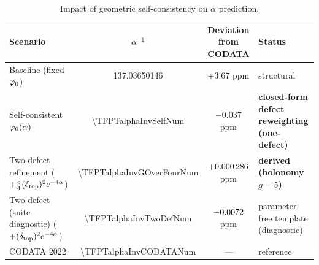 \begin{table}[H]
\centering
\small
\setlength{\tabcolsep}{4pt}
\begin{tabularx}{\linewidth}{@{}lccX@{}}
\toprule
\textbf{Scenario} & $\alpha^{-1}$ & \textbf{Deviation from CODATA} & \textbf{Status}\\
\midrule
Baseline (fixed $\varphi_0$) & 137.03650146 & $+3.67$ ppm & structural\\
Self-consistent $\varphi_0(\alpha)$ & \num[round-mode=places,round-precision=10]{\TFPTalphaInvSelfNum} & $-0.037$ ppm & \textbf{closed-form defect reweighting (one-defect)}\\
Two-defect refinement ($+\tfrac54(\delta_{\mathrm{top}})^2 e^{-4\alpha}$) & \num[round-mode=places,round-precision=12]{\TFPTalphaInvGOverFourNum} & $+\num[round-mode=places,round-precision=6]{\TFPTalphaPpmGOverFourNum}$ ppm & \textbf{derived (holonomy $g=5$)}\\
Two-defect (suite diagnostic) ($+(\delta_{\mathrm{top}})^2 e^{-4\alpha}$) & \num[round-mode=places,round-precision=10]{\TFPTalphaInvTwoDefNum} & $\num[round-mode=places,round-precision=4]{\TFPTalphaPpmTwoDefNum}$ ppm & parameter-free template (diagnostic)\\
CODATA 2022 & \num[round-mode=places,round-precision=9]{\TFPTalphaInvCODATANum} & --- & reference\\
\bottomrule
\end{tabularx}
\caption{Impact of geometric self-consistency on $\alpha$ prediction.}
\label{tab:alpha}
\end{table}

\TFPTAlphaAuditTable


